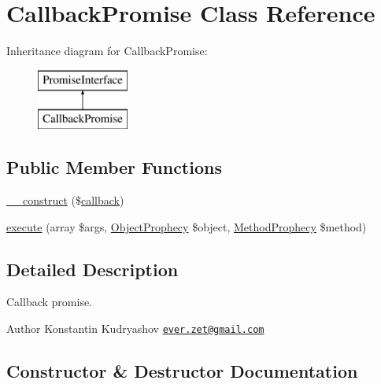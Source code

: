 \hypertarget{class_prophecy_1_1_promise_1_1_callback_promise}{}\section{Callback\+Promise Class Reference}
\label{class_prophecy_1_1_promise_1_1_callback_promise}
Inheritance diagram for Callback\+Promise\+:\begin{figure}[H]
\begin{center}
\leavevmode
\includegraphics[height=2.000000cm]{class_prophecy_1_1_promise_1_1_callback_promise}
\end{center}
\end{figure}
\subsection*{Public Member Functions}
\begin{DoxyCompactItemize}
\item 
\mbox{\hyperlink{class_prophecy_1_1_promise_1_1_callback_promise_aae70a2214e4c3d274a97b54e983b5fdf}{\+\_\+\+\_\+construct}} (\$\mbox{\hyperlink{_functions_8php_ae2242eb47799ca6a822b022dc1bd1ac9}{callback}})
\item 
\mbox{\hyperlink{class_prophecy_1_1_promise_1_1_callback_promise_a2b8542872672f9ac4ed0c942f931f0c6}{execute}} (array \$args, \mbox{\hyperlink{class_prophecy_1_1_prophecy_1_1_object_prophecy}{Object\+Prophecy}} \$object, \mbox{\hyperlink{class_prophecy_1_1_prophecy_1_1_method_prophecy}{Method\+Prophecy}} \$method)
\end{DoxyCompactItemize}


\subsection{Detailed Description}
Callback promise.

\begin{DoxyAuthor}{Author}
Konstantin Kudryashov \href{mailto:ever.zet@gmail.com}{\tt ever.\+zet@gmail.\+com} 
\end{DoxyAuthor}


\subsection{Constructor \& Destructor Documentation}
\mbox{\label{class_prophecy_1_1_promise_1_1_callback_promise_aae70a2214e4c3d274a97b54e983b5fdf}} 
